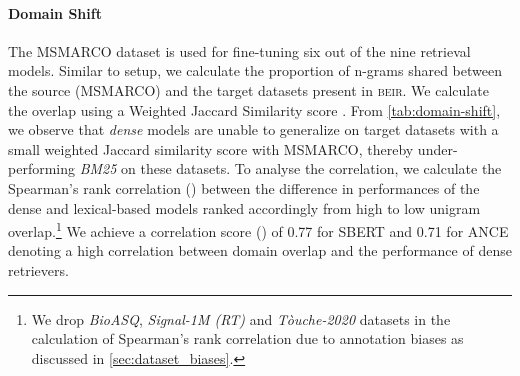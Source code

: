 \documentclass[11pt]{article}
\newcommand{\custo}[1]{\textsc{\normalsize #1}}
\newcommand{\beir}{\custo{beir}\xspace}
\begin{document}
\paragraph{Domain Shift}\label{sec:domain-shift} 
The MSMARCO \cite{nguyen2016ms} dataset is used for fine-tuning six out of the nine retrieval models. Similar to  setup, we calculate the proportion of n-grams shared between the source (MSMARCO) and the target datasets present in \beir. We calculate the overlap using a Weighted Jaccard Similarity score \cite{ioffe2010improved}. From \autoref{tab:domain-shift}, we observe that \emph{dense} models are unable to generalize on target datasets with a small weighted Jaccard similarity score with MSMARCO, thereby under-performing \emph{BM25} on these datasets. To analyse the correlation, we calculate the Spearman's rank correlation () between the difference in performances of the dense and lexical-based models ranked accordingly from high to low unigram overlap.\footnote{We drop \textit{BioASQ}, \textit{Signal-1M (RT)} and \textit{T\`ouche-2020} datasets in the calculation of Spearman's rank correlation due to annotation biases as discussed in \autoref{sec:dataset_biases}.} We achieve a correlation score () of 0.77 for SBERT and 0.71 for ANCE denoting a high correlation between domain overlap and the performance of dense retrievers.
\end{document}
